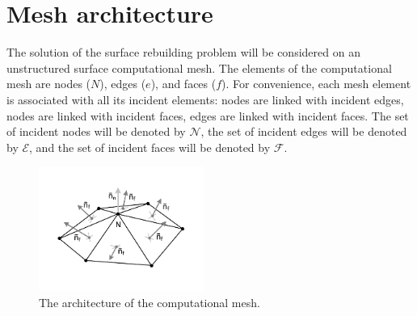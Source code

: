\documentclass[
11pt,%
tightenlines,%
twoside,%
onecolumn,%
nofloats,%
nobibnotes,%
nofootinbib,%
superscriptaddress,%
noshowpacs,%
centertags]%
{revtex4-2}
\begin{document}

\section{Mesh architecture}

The solution of the surface rebuilding problem will be considered on an unstructured surface computational mesh.
The elements of the computational mesh are nodes ($N$), edges ($e$), and faces ($f$).
For convenience, each mesh element is associated with all its incident elements: nodes are linked with incident edges, nodes are linked with incident faces, edges are linked with incident faces.
The set of incident nodes will be denoted by $\mathscr{N}$, the set of incident edges will be denoted by $\mathscr{E}$, and the set of incident faces will be denoted by $\mathscr{F}$.

\begin{figure}[h]
\includegraphics[width=0.48\textwidth]{pics/pic_architecture_size.pdf}
\caption{The architecture of the computational mesh.}\label{fig:pic_architecture}
\end{figure}
\end{document}
